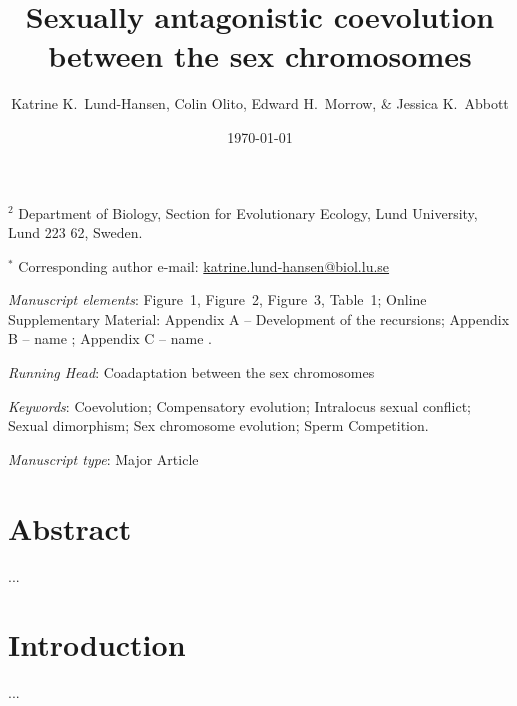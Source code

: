 \documentclass{article}
\title{Sexually antagonistic coevolution between the sex chromosomes}
\author{Katrine K.~Lund-Hansen, Colin Olito, Edward H.~Morrow, \& Jessica K.~Abbott}
\date{\today}
\makeatletter
\newcommand\hl[1]{%
  \bgroup
  \hskip0pt\color{blue!80!black}%
  #1%
  \egroup
}
\renewcommand\@seccntformat[1]{}
\makeatother
\begin{document}
\maketitle

\noindent{} $^{2}$ Department of Biology, Section for Evolutionary Ecology, Lund University, Lund 223 62, Sweden.

\noindent{} $^{\ast}$ Corresponding author e-mail: \url{katrine.lund-hansen@biol.lu.se}

\bigskip

\noindent{} \textit{Manuscript elements}: Figure~1, Figure~2, Figure~3, Table~1; Online Supplementary Material: Appendix A -- Development of the recursions; Appendix B -- \hl{name}; Appendix C -- \hl{name}.

\bigskip
\noindent{} \textit{Running Head}: Coadaptation between the sex chromosomes

\bigskip

\noindent{} \textit{Keywords}: Coevolution; Compensatory evolution; Intralocus sexual conflict;  Sexual dimorphism; Sex chromosome evolution; Sperm Competition.

\bigskip

\noindent{} \textit{Manuscript type}: Major Article

\bigskip


\linenumbers
\modulolinenumbers[1]
\renewcommand\linenumberfont{\normalfont\small}


\newpage{}
\section*{Abstract}

\noindent{} ...


\section*{Introduction}

...
\end{document}

